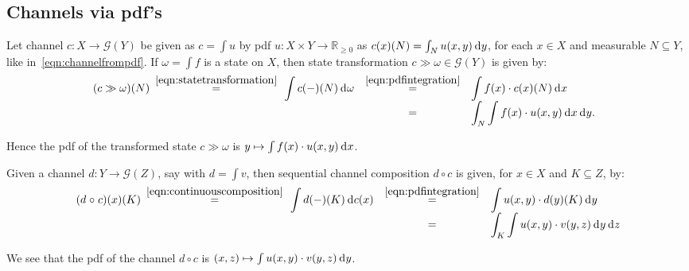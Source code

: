\documentclass{mscs}
\newcommand{\after}{\mathrel{\circ}}
\newcommand{\Giry}{\mathcal{G}}
\newcommand{\R}{\mathbb{R}}
\newcommand{\intd}{{\kern.2em}\mathrm{d}{\kern.03em}}
\begin{document}
\subsection{Channels via pdf's}\label{subsec:channelviapdf}

Let channel $c\colon X \rightarrow \Giry(Y)$ be given as $c = \int u$
by pdf $u\colon X\times Y \rightarrow \R_{\geq 0}$ as $c(x)(N) =
\int_{N} u(x,y) \intd y$, for each $x\in X$ and measurable $N\subseteq
Y$, like in~\eqref{eqn:channelfrompdf}. If $\omega = \int f$ is a
state on $X$, then state transformation $c \gg \omega \in \Giry(Y)$
is given by:
\begin{equation}
\label{eqn:pdfstatetransformation}
\hspace*{-0.8em}\begin{array}{rcl}
(c \gg \omega)(N)
\hspace*{\arraycolsep}\smash{\stackrel{\eqref{eqn:statetransformation}}{=}}\hspace*{\arraycolsep}
\displaystyle \int c(-)(N) \intd \omega
& \smash{\stackrel{\eqref{eqn:pdfintegration}}{=}} &
\displaystyle \int f(x) \cdot c(x)(N) \intd x
\\
& = &
\displaystyle \int_{N} \int f(x) \cdot u(x,y) \intd x \intd y.
\end{array}
\end{equation}

\noindent Hence the pdf of the transformed state $c \gg \omega$ is $y
\mapsto \int f(x) \cdot u(x,y) \intd x$.

Given a channel $d \colon Y \rightarrow \Giry(Z)$, say with $d = \int
v$, then sequential channel composition $d \after c$ is given, for
$x\in X$ and $K\subseteq Z$, by:
\begin{equation}
\label{eqn:pdfseqcomposition}
\begin{array}{rcl}
(d \after c)(x)(K)
\hspace*{\arraycolsep}\smash{\stackrel{\eqref{eqn:continuouscomposition}}{=}}\hspace*{\arraycolsep}
\displaystyle \int d(-)(K) \intd c(x)
& \smash{\stackrel{\eqref{eqn:pdfintegration}}{=}} &
\displaystyle \int u(x,y) \cdot d(y)(K) \intd y
\\
& = &
\displaystyle \int_{K} \int u(x,y) \cdot v(y,z) \intd y \intd z
\end{array}
\end{equation}

\noindent We see that the pdf of the channel $d \after c$ is $(x,z)
\mapsto \int u(x,y) \cdot v(y,z) \intd y$.
\end{document}
